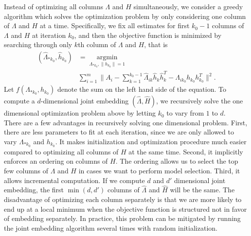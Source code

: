 \documentclass[10pt,journal,compsoc]{IEEEtran}
\begin{document}
\noindent Instead of optimizing all columns $\Lambda$ and $H$ simultaneously, we consider a greedy algorithm which solves the optimization problem by only considering one column of  $\Lambda$ and $H$ at a time. Specifically, we fix all estimates for first $k_0-1$ columns of $\Lambda$ and $H$ at iteration $k_0$, and then the objective function is minimized by searching through only $k$th column of $\Lambda$ and $H$, that is
\begin{align}(\hat{\Lambda}_{*k_0},\hat{h}_{k_0}) &= \underset{\Lambda_{*k_0},\|h_{k_0}\|=1}{\operatorname{argmin}} \nonumber\\ &\sum\limits_{i=1}^{m} \| A_i- \sum\limits_{k=1}^{k_0-1} \hat{\Lambda}_{ik} \hat{h}_{k} \hat{h}_{k}^T -\Lambda_{ik_0} h_{k_0} h_{k_0}^T\|  ^2.
\label{eq:2}
\end{align} 
Let $f(\Lambda_{*k_0},h_{k_0})$ denote the sum on the left hand side of the equation. To compute a $d$-dimensional joint embedding $(\hat{\Lambda},\hat{H})$, we recursively solve the one dimensional optimization problem above by letting $k_0$ to vary from $1$ to $d$. \\

\noindent There are a few advantages in recursively solving one dimensional problem. First, there are less parameters to fit at each iteration, since we are only allowed to vary $\Lambda_{*k_0}$ and $h_{k_0}$. It makes initialization and optimization procedure much easier compared to optimizing all columns of $H$ at the same time. Second, it implicitly enforces an ordering on columns of $H$. The ordering allows us to select the top few columns of $\Lambda$ and $H$ in cases we want to perform model selection. Third, it allows incremental computation. If we compute $d$ and $d'$ dimensional joint embedding, the first $\min(d,d')$ columns of $\hat{\Lambda}$ and $\hat{H}$ will be the same. The disadvantage of optimizing each column separately is that we are more likely to end up at a local minimum when the objective function is structured not in favor of embedding separately. In practice, this problem can be mitigated by running the joint embedding algorithm several times with random initialization. \\ 
\end{document}

